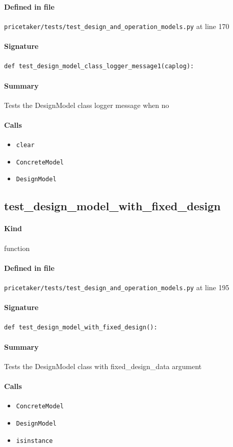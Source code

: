 \documentclass[11pt]{report}
\begin{document}
\paragraph{Defined in file} \texttt{pricetaker/tests/test\_design\_and\_operation\_models.py} at line 170
\paragraph{Signature} \texttt{def test\_design\_model\_class\_logger\_message1(caplog):}
\paragraph{Summary} Tests the DesignModel class logger message when no
\paragraph{Calls}
\begin{itemize}[leftmargin=*]
  \item \texttt{clear}
  \item \texttt{ConcreteModel}
  \item \texttt{DesignModel}
\end{itemize}
\subsection{test\_design\_model\_with\_fixed\_design}
\label{def:pricetaker-tests-test_design_and_operation_models.py:test_design_model_with_fixed_design:L195}
\paragraph{Kind} function
\paragraph{Defined in file} \texttt{pricetaker/tests/test\_design\_and\_operation\_models.py} at line 195
\paragraph{Signature} \texttt{def test\_design\_model\_with\_fixed\_design():}
\paragraph{Summary} Tests the DesignModel class with fixed\_design\_data argument
\paragraph{Calls}
\begin{itemize}[leftmargin=*]
  \item \texttt{ConcreteModel}
  \item \texttt{DesignModel}
  \item \texttt{isinstance}
\end{itemize}
\end{document}
